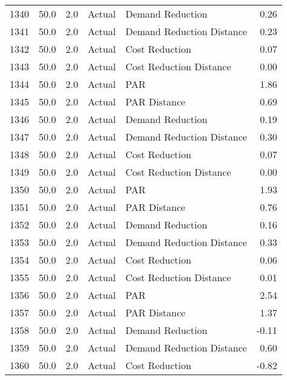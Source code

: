 \begin{longtable}{lrrllr}
1340 &         50.0 &     2.0 &         Actual &           Demand Reduction &   0.26 \\
1341 &         50.0 &     2.0 &         Actual &  Demand Reduction Distance &   0.23 \\
1342 &         50.0 &     2.0 &         Actual &             Cost Reduction &   0.07 \\
1343 &         50.0 &     2.0 &         Actual &    Cost Reduction Distance &   0.00 \\
1344 &         50.0 &     2.0 &         Actual &                        PAR &   1.86 \\
1345 &         50.0 &     2.0 &         Actual &               PAR Distance &   0.69 \\
1346 &         50.0 &     2.0 &         Actual &           Demand Reduction &   0.19 \\
1347 &         50.0 &     2.0 &         Actual &  Demand Reduction Distance &   0.30 \\
1348 &         50.0 &     2.0 &         Actual &             Cost Reduction &   0.07 \\
1349 &         50.0 &     2.0 &         Actual &    Cost Reduction Distance &   0.00 \\
1350 &         50.0 &     2.0 &         Actual &                        PAR &   1.93 \\
1351 &         50.0 &     2.0 &         Actual &               PAR Distance &   0.76 \\
1352 &         50.0 &     2.0 &         Actual &           Demand Reduction &   0.16 \\
1353 &         50.0 &     2.0 &         Actual &  Demand Reduction Distance &   0.33 \\
1354 &         50.0 &     2.0 &         Actual &             Cost Reduction &   0.06 \\
1355 &         50.0 &     2.0 &         Actual &    Cost Reduction Distance &   0.01 \\
1356 &         50.0 &     2.0 &         Actual &                        PAR &   2.54 \\
1357 &         50.0 &     2.0 &         Actual &               PAR Distance &   1.37 \\
1358 &         50.0 &     2.0 &         Actual &           Demand Reduction &  -0.11 \\
1359 &         50.0 &     2.0 &         Actual &  Demand Reduction Distance &   0.60 \\
1360 &         50.0 &     2.0 &         Actual &             Cost Reduction &  -0.82 \\

\end{longtable}
